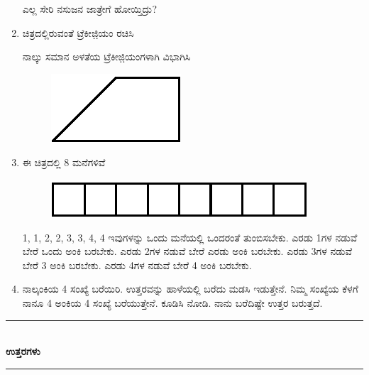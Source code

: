 \begin{enumerate}
ಎಲ್ಲ ಸೇರಿ ನಸುಜನ ಜಾತ್ರೇಗೆ ಹೋಯ್ತಿದ್ರು? 

\item ಚಿತ್ರದಲ್ಲಿರುವಂತೆ ಟ್ರೆಕೀಜಿ಼ಯಂ ರಚಿಸಿ 

ನಾಲ್ಕು ಸಮಾನ ಅಳತೆಯ ಟ್ರೆಕೀಜಿ಼ಯಂಗಳಾಗಿ ವಿಭಾಗಿಸಿ 
\begin{figure}[H]
\centering
\includegraphics[scale=1.5]{images/chap2/q28.eps}
\end{figure}
 
 \eject
 
 \item ಈ ಚಿತ್ರದಲ್ಲಿ 8 ಮನೆಗಳಿವೆ 
 \begin{figure}[H]
\centering
\includegraphics{images/chap2/q29.eps}
\end{figure}

1, 1, 2, 2, 3, 3, 4, 4 ಇವುಗಳನ್ನು ಒಂದು ಮನೆಯಲ್ಲಿ ಒಂದರಂತೆ ತುಂಬಿಸ\break ಬೇಕು. ಎರಡು 1ಗಳ ನಡುವೆ ಬೇರೆ ಒಂದು ಅಂಕಿ ಬರಬೇಕು. ಎರಡು 2ಗಳ ನಡುವೆ ಬೇರೆ ಎರಡು ಅಂಕಿ ಬರಬೇಕು. ಎರಡು 3ಗಳ ನಡುವೆ ಬೇರೆ 3 ಅಂಕಿ ಬರಬೇಕು. ಎರಡು 4ಗಳ ನಡುವೆ ಬೇರೆ 4 ಅಂಕಿ ಬರಬೇಕು.

\item ನಾಲ್ಕಂಕಿಯ 4 ಸಂಖ್ಯೆ ಬರೆಯಿರಿ. ಉತ್ತರವನ್ನು ಹಾಳೆಯಲ್ಲಿ ಬರೆದು ಮಡಸಿ ಇಡುತ್ತೇನೆ. ನಿಮ್ಮ ಸಂಖ್ಯೆಯ ಕೆಳಗೆ ನಾನೂ 4 ಅಂಕಿಯ 4 ಸಂಖ್ಯೆ ಬರೆಯುತ್ತೇನೆ. ಕೂಡಿಸಿ ನೋಡಿ. ನಾನು ಬರೆದಿಷ್ಟೇ ಉತ್ತರ ಬರುತ್ತದೆ. 
\end{enumerate}

\smallskip

\begin{center}
\rule{5cm}{1pt}\\[3pt]
{\Large\bfseries ಉತ್ತರಗಳು}\\[-0.1cm]
\rule{5cm}{1pt}
\end{center}

